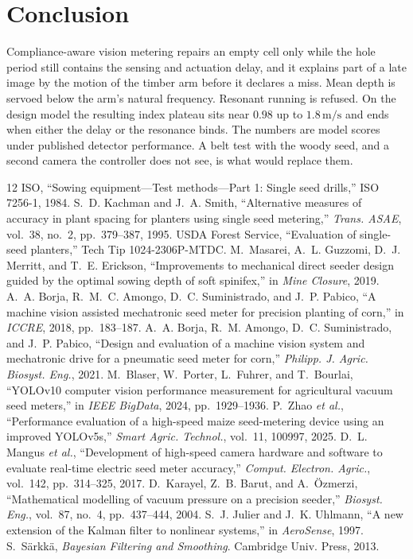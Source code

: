 \documentclass[11pt,a4paper]{article}
\begin{document}
\section{Conclusion}
Compliance-aware vision metering repairs an empty cell only while the hole period still contains the sensing and actuation delay, and it explains part of a late image by the motion of the timber arm before it declares a miss. Mean depth is servoed below the arm's natural frequency. Resonant running is refused. On the design model the resulting index plateau sits near \(0.98\) up to \(1.8\,\mathrm{m/s}\) and ends when either the delay or the resonance binds. The numbers are model scores under published detector performance. A belt test with the woody seed, and a second camera the controller does not see, is what would replace them.

\begin{thebibliography}{12}
ISO, ``Sowing equipment---Test methods---Part 1: Single seed drills,'' ISO 7256-1, 1984.
S.~D. Kachman and J.~A. Smith, ``Alternative measures of accuracy in plant spacing for planters using single seed metering,'' \emph{Trans. ASAE}, vol.~38, no.~2, pp.~379--387, 1995.
USDA Forest Service, ``Evaluation of single-seed planters,'' Tech Tip 1024-2306P-MTDC.
M.~Masarei, A.~L. Guzzomi, D.~J. Merritt, and T.~E. Erickson, ``Improvements to mechanical direct seeder design guided by the optimal sowing depth of soft spinifex,'' in \emph{Mine Closure}, 2019.
A.~A. Borja, R.~M.~C. Amongo, D.~C. Suministrado, and J.~P. Pabico, ``A machine vision assisted mechatronic seed meter for precision planting of corn,'' in \emph{ICCRE}, 2018, pp.~183--187.
A.~A. Borja, R.~M. Amongo, D.~C. Suministrado, and J.~P. Pabico, ``Design and evaluation of a machine vision system and mechatronic drive for a pneumatic seed meter for corn,'' \emph{Philipp. J. Agric. Biosyst. Eng.}, 2021.
M.~Blaser, W.~Porter, L.~Fuhrer, and T.~Bourlai, ``YOLOv10 computer vision performance measurement for agricultural vacuum seed meters,'' in \emph{IEEE BigData}, 2024, pp.~1929--1936.
P.~Zhao \emph{et al.}, ``Performance evaluation of a high-speed maize seed-metering device using an improved YOLOv5s,'' \emph{Smart Agric. Technol.}, vol.~11, 100997, 2025.
D.~L. Mangus \emph{et al.}, ``Development of high-speed camera hardware and software to evaluate real-time electric seed meter accuracy,'' \emph{Comput. Electron. Agric.}, vol.~142, pp.~314--325, 2017.
D.~Karayel, Z.~B. Barut, and A.~\"Ozmerzi, ``Mathematical modelling of vacuum pressure on a precision seeder,'' \emph{Biosyst. Eng.}, vol.~87, no.~4, pp.~437--444, 2004.
S.~J. Julier and J.~K. Uhlmann, ``A new extension of the Kalman filter to nonlinear systems,'' in \emph{AeroSense}, 1997.
S.~S\"arkk\"a, \emph{Bayesian Filtering and Smoothing}. Cambridge Univ. Press, 2013.
\end{thebibliography}
\end{document}
